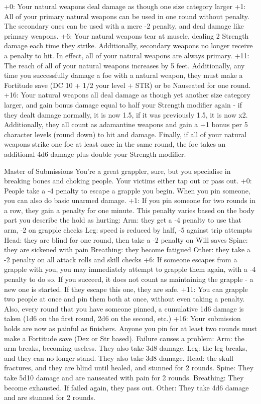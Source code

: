 +0: Your natural weapons deal damage as though one size category larger
+1: All of your primary natural weapons can be used in one round without penalty. The secondary ones can be used with a mere -2 penalty, and deal damage like primary weapons.
+6: Your natural weapons tear at muscle, dealing 2 Strength damage each time they strike. Additionally, secondary weapons no longer receive a penalty to hit. In effect, all of your natural weapons are always primary.
+11: The reach of all of your natural weapons increases by 5 feet. Additionally, any time you successfully damage a foe with a natural weapon, they must make a Fortitude save (DC 10 + 1/2 your level + STR) or be Nauseated for one round.
+16: Your natural weapons all deal damage as though yet another size category larger, and gain bonus damage equal to half your Strength modifier again - if they dealt damage normally, it is now 1.5, if it was previously 1.5, it is now x2. Additionally, they all count as adamantine weapons and gain a +1 bonus per 5 character levels (round down) to hit and damage. Finally, if all of your natural weapons strike one foe at least once in the same round, the foe takes an additional 4d6 damage plus double your Strength modifier.

Master of Submissions
You're a great grappler, sure, but you specialise in breaking bones and choking people. Your victims either tap out or pass out.
+0: People take a -4 penalty to escape a grapple you begin. When you pin someone, you can also do basic unarmed damage.
+1: If you pin someone for two rounds in a row, they gain a penalty for one minute. This penalty varies based on the body part you describe the hold as hurting:
Arm: they get a -4 penalty to use that arm, -2 on grapple checks
Leg: speed is reduced by half, -5 against trip attempts
Head: they are blind for one round, then take a -2 penalty on Will saves
Spine: they are sickened with pain
Breathing: they become fatigued
Other: they take a -2 penalty on all attack rolls and skill checks
+6: If someone escapes from a grapple with you, you may immediately attempt to grapple them again, with a -4 penalty to do so. If you succeed, it does not count as maintaining the grapple - a new one is started. If they escape this one, they are safe.
+11: You can grapple two people at once and pin them both at once, without even taking a penalty. Also, every round that you have someone pinned, a cumulative 1d6 damage is taken (1d6 on the first round, 2d6 on the second, etc.)
+16: Your submission holds are now as painful as finishers. Anyone you pin for at least two rounds must make a Fortitude save (Dex or Str based). Failure causes a problem:
Arm: the arm breaks, becoming useless. They also take 3d8 damage.
Leg: the leg breaks, and they can no longer stand. They also take 3d8 damage.
Head: the skull fractures, and they are blind until healed, and stunned for 2 rounds.
Spine: They take 5d10 damage and are nauseated with pain for 2 rounds.
Breathing: They become exhausted. If failed again, they pass out.
Other: They take 4d6 damage and are stunned for 2 rounds.